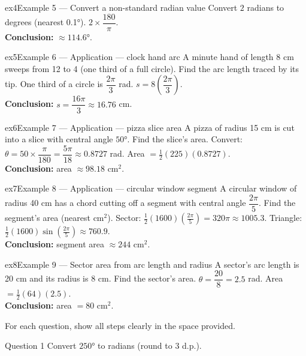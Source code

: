 \documentclass[11pt]{article}
\begin{document}
\begin{example}{ex4}{Example 5 --- Convert a non-standard radian value}
Convert $2$ radians to degrees (nearest 0.1°).\soln
$2\times\dfrac{180}{\pi}$.\\[3pt]\textbf{Conclusion:} $\approx114.6°$.
\end{example}

\begin{example}{ex5}{Example 6 --- Application --- clock hand arc}
A minute hand of length 8 cm sweeps from 12 to 4 (one third of a full circle). Find the arc length traced by its tip.\soln
One third of a circle is $\dfrac{2\pi}3$ rad. $s=8\left(\dfrac{2\pi}3\right)$.\\[3pt]\textbf{Conclusion:} $s=\dfrac{16\pi}3\approx16.76$ cm.
\end{example}

\begin{example}{ex6}{Example 7 --- Application --- pizza slice area}
A pizza of radius 15 cm is cut into a slice with central angle $50°$. Find the slice's area.\soln
Convert: $\theta=50\times\dfrac{\pi}{180}=\dfrac{5\pi}{18}\approx0.8727$ rad. Area $=\tfrac12(225)(0.8727)$.\\[3pt]\textbf{Conclusion:} area $\approx98.18\text{ cm}^2$.
\end{example}

\begin{example}{ex7}{Example 8 --- Application --- circular window segment}
A circular window of radius 40 cm has a chord cutting off a segment with central angle $\dfrac{2\pi}5$. Find the segment's area (nearest cm$^2$).\soln
Sector: $\tfrac12(1600)\left(\tfrac{2\pi}5\right)=320\pi\approx1005.3$. Triangle: $\tfrac12(1600)\sin\!\left(\tfrac{2\pi}5\right)\approx760.9$.\\[3pt]\textbf{Conclusion:} segment area $\approx244\text{ cm}^2$.
\end{example}

\begin{example}{ex8}{Example 9 --- Sector area from arc length and radius}
A sector's arc length is 20 cm and its radius is 8 cm. Find the sector's area.\soln
$\theta=\dfrac{20}8=2.5$ rad. Area $=\tfrac12(64)(2.5)$.\\[3pt]\textbf{Conclusion:} area $=80\text{ cm}^2$.
\end{example}

\clearpage
{}
For each question, show all steps clearly in the space provided.

\begin{qbox}{Question 1}
Convert $250°$ to radians (round to 3 d.p.).\workspace{2.4cm}
\end{qbox}
\end{document}
